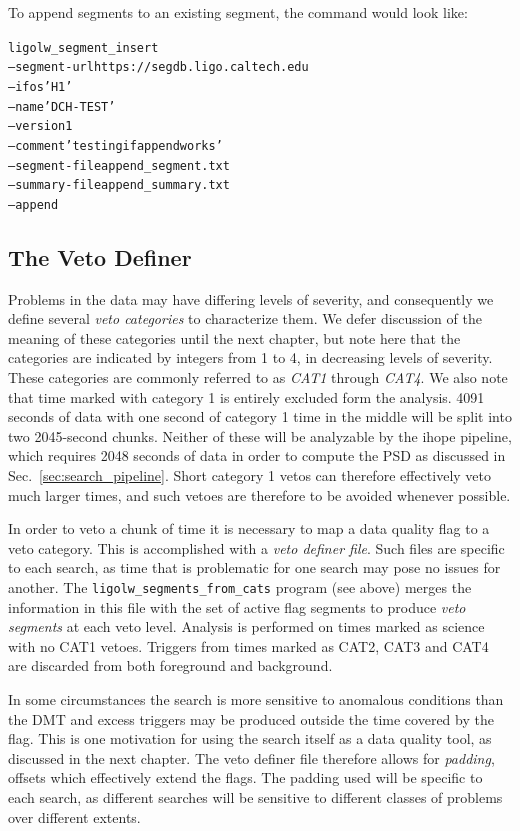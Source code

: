 {To append segments to an existing segment, the command would look like:
%
\begin{alltt}
ligolw\_segment\_insert 
  --segment-url https://segdb.ligo.caltech.edu
  --ifos 'H1'
  --name 'DCH-TEST'
  --version 1
  --comment 'testing if append works'
  --segment-file append\_segment.txt
  --summary-file append\_summary.txt
  --append
\end{alltt}


\subsection{The Veto Definer}
\label{sec:veto_definer}

Problems in the data may have differing levels of severity, and
consequently we define several \emph{veto categories} to characterize
them.  We defer discussion of the meaning of these categories until
the next chapter, but note here that the categories are indicated by
integers from 1 to 4, in decreasing levels of severity.  These
categories are commonly referred to as \emph{CAT1} through
\emph{CAT4}.  We also note that time marked with category 1 is
entirely excluded form the analysis.  4091 seconds of data with one
second of category 1 time in the middle will be split into two
2045-second chunks.  Neither of these will be analyzable by the ihope
pipeline, which requires 2048 seconds of data in order to compute the
PSD as discussed in Sec.~\ref{sec:search_pipeline}.  Short category 1
vetos can therefore effectively veto much larger times, and such
vetoes are therefore to be avoided whenever possible. 

In order to veto a chunk of time it is necessary to map a data quality
flag to a veto category.  This is accomplished with a \emph{veto
definer file}.  Such files are specific to each search, as time that
is problematic for one search may pose no issues for another.  The
\texttt{ligolw\_segments\_from\_cats} program (see above) merges the
information in this file with the set of active flag segments to
produce \emph{veto segments} at each veto level.  Analysis is
performed on times marked as science with no CAT1 vetoes.  Triggers
from times marked as CAT2, CAT3 and CAT4 are discarded from both
foreground and background.

In some circumstances the search is more sensitive to anomalous
conditions than the DMT and excess triggers may be produced outside
the time covered by the flag.  This is one motivation for using the
search itself as a data quality tool, as discussed in the next
chapter.  The veto definer file therefore allows for \emph{padding},
offsets which effectively extend the flags.  The padding used will be
specific to each search, as different searches will be sensitive to
different classes of problems over different extents.

}
